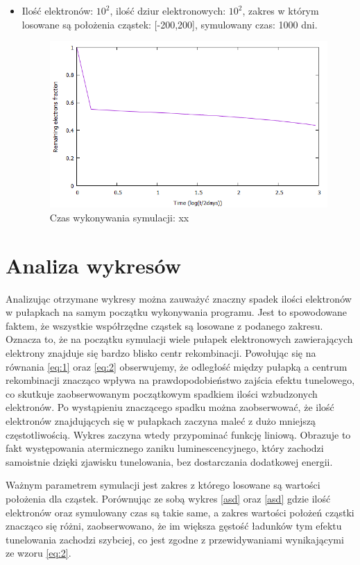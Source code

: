 \begin{itemize}
\item Ilość elektronów: $10^{2}$, ilość dziur elektronowych: $10^{2}$, zakres w którym losowane są położenia cząstek: [-200,200], symulowany czas: 1000 dni.
\begin{figure}[H]
\centering
\includegraphics[width=17cm]{wykres2}
\caption{ Czas wykonywania symulacji: xx}
\label{fig:Tunelowanie}
\end{figure}




\end{itemize}
\section{Analiza wykresów}
Analizując otrzymane wykresy można zauważyć znaczny spadek ilości elektronów w pułapkach na samym początku wykonywania programu. Jest to spowodowane faktem, że wszystkie współrzędne cząstek są losowane z podanego zakresu. Oznacza to, że na początku symulacji wiele pułapek elektronowych zawierających elektrony znajduje się bardzo blisko centr rekombinacji. Powołując się na równania \ref{eq:1} oraz \ref{eq:2} obserwujemy, że odległość między pułapką a centrum rekombinacji znacząco wpływa na prawdopodobieństwo zajścia efektu tunelowego, co skutkuje zaobserwowanym początkowym spadkiem ilości wzbudzonych elektronów. Po wystąpieniu znaczącego spadku można zaobserwować, że ilość elektronów znajdujących się w pułapkach zaczyna maleć z dużo mniejszą częstotliwością. Wykres zaczyna wtedy przypominać funkcję liniową. Obrazuje to fakt występowania atermicznego zaniku luminescencyjnego, który zachodzi samoistnie dzięki zjawisku tunelowania, bez dostarczania dodatkowej energii. 

Ważnym parametrem symulacji jest zakres z którego losowane są wartości położenia dla cząstek. Porównując ze sobą wykres \ref{asd} oraz \ref{asd} gdzie ilość elektronów oraz symulowany czas są takie same, a zakres wartości położeń cząstki znacząco się różni, zaobserwowano, że im większa gęstość ładunków tym efektu tunelowania zachodzi szybciej, co jest zgodne z przewidywaniami wynikającymi ze wzoru \ref{eq:2}.
